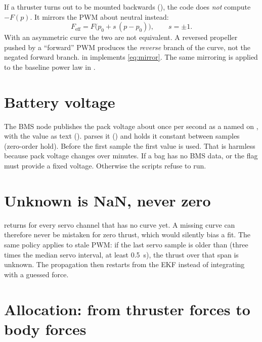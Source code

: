 If a thruster turns out to be mounted backwards (), the code does
\emph{not} compute $-F(p)$. It mirrors the PWM about neutral instead:
\begin{equation}
  F_\mathrm{eff} = F\bigl(p_0 + s\,(p - p_0)\bigr), \qquad s = \pm1 .
  \label{eq:mirror}
\end{equation}
With an asymmetric curve the two are not equivalent. A reversed propeller pushed by a
``forward'' PWM produces the \emph{reverse} branch of the curve, not the negated forward
branch.  in  implements \eqref{eq:mirror}. The same
mirroring is applied to the baseline power law in .

\section{Battery voltage}

The BMS node publishes the pack voltage about once per second as a 
named  on , with the value as text
().  parses it () and
 holds it constant between samples (zero-order hold). Before the
first sample the first value is used. That is harmless because pack voltage changes over
minutes. If a bag has no BMS data,  or the 
flag must provide a fixed voltage. Otherwise the scripts refuse to run.

\section{Unknown is NaN, never zero}

 returns  for every servo channel that has no curve yet. A
missing curve can therefore never be mistaken for zero thrust, which would silently bias a
fit. The same policy applies to stale PWM: if the last servo sample is older than
 (three times the median servo interval, at least \qty{0.5}{\second}),
the thrust over that span is unknown. The propagation then restarts from the EKF instead
of integrating with a guessed force.

\section{Allocation: from thruster forces to body forces}

